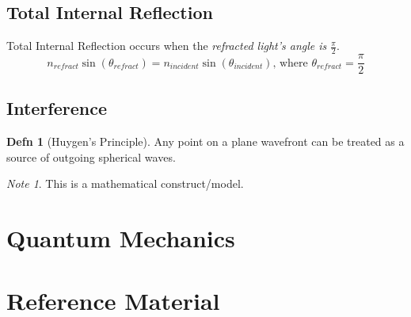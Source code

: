\documentclass[10pt,letterpaper,final,twoside,notitlepage]{article}
\numberwithin{equation}{section} %
\theoremstyle{definition}
\newtheorem{definition}{Defn} %
\theoremstyle{remark}
\newtheorem{note}{Note}[definition] %
\begin{document}
	\subsection*{Total Internal Reflection} \label{subsec:Total Internal Reflection}
		Total Internal Reflection occurs when the \emph{refracted light's angle is $\frac{\pi}{2}$}.
		\begin{equation} \label{eq:Total Internal Reflection}
			n_{refract} \sin \left( \theta_{refract} \right) = n_{incident} \sin \left( \theta_{incident} \right) \text{, where } \theta_{refract} = \frac{\pi}{2}
		\end{equation}
		
	\subsection*{Interference} \label{subsec:Light Interference}
		\begin{definition}[Huygen's Principle] \label{def:Huygen's Principle}
			Any point on a plane wavefront can be treated as a source of outgoing spherical waves.
			\begin{note}
				This is a mathematical construct/model.
			\end{note}
		\end{definition}

\section{Quantum Mechanics} \label{sec:Quantum Mech}

\appendix
\section{Reference Material} \label{sec:Reference Material}



\end{document}
